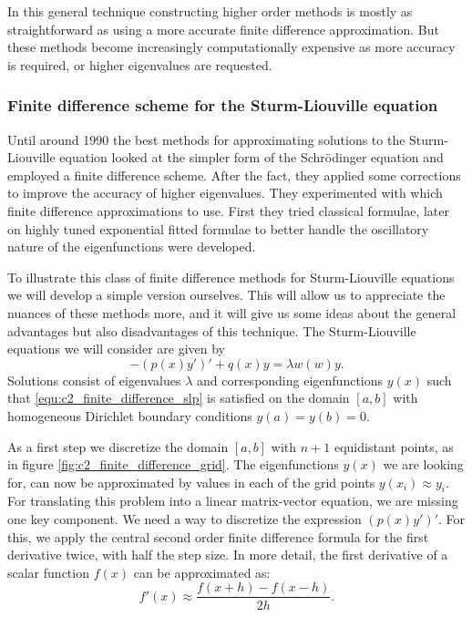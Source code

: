 In this general technique constructing higher order methods is mostly as straightforward as using a more accurate finite difference approximation. But these methods become increasingly computationally expensive as more accuracy is required, or higher eigenvalues are requested.


\subsubsection{Finite difference scheme for the Sturm-Liouville equation}

Until around 1990 the best methods \cite{andrew_correction_1985,vandenberghe_accurate_1991} for approximating solutions to the Sturm-Liouville equation looked at the simpler form of the Schrödinger equation and employed a finite difference scheme. After the fact, they applied some corrections to improve the accuracy of higher eigenvalues. They experimented with which finite difference approximations to use. First they tried classical formulae, later on highly tuned exponential fitted formulae to better handle the oscillatory nature of the eigenfunctions were developed.

To illustrate this class of finite difference methods for Sturm-Liouville equations we will develop a simple version ourselves. This will allow us to appreciate the nuances of these methods more, and it will give us some ideas about the general advantages but also disadvantages of this technique. The Sturm-Liouville equations we will consider are given by
\begin{equation}\label{equ:c2_finite_difference_slp}
    -(p(x)y')' + q(x) y = \lambda w(w) y\text{.}
\end{equation}
Solutions consist of eigenvalues $\lambda$ and corresponding eigenfunctions $y(x)$ such that \eqref{equ:c2_finite_difference_slp} is satisfied on the domain $[a, b]$ with homogeneous Dirichlet boundary conditions $y(a) = y(b) = 0$.

As a first step we discretize the domain $[a, b]$ with $n+1$ equidistant points, as in figure \ref{fig:c2_finite_difference_grid}. The eigenfunctions $y(x)$ we are looking for, can now be approximated by values in each of the grid points $y(x_i) \approx y_i$. For translating this problem into a linear matrix-vector equation, we are missing one key component. We need a way to discretize the expression $(p(x) y')'$. For this, we apply the central second order finite difference formula for the first derivative twice, with half the step size. In more detail, the first derivative of a scalar function $f(x)$ can be approximated as:
$$
    f'(x) \approx \frac{f(x + h) - f(x - h)}{2h}\text{.}
$$

